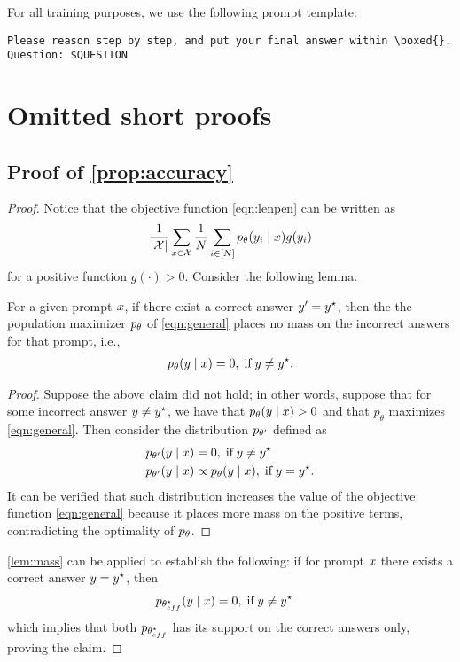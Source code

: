 For all training purposes, we use the following prompt template: 

\texttt{Please reason step by step, and put your final answer within \textbackslash boxed\{\}. Question: \$QUESTION}


\section{Omitted short proofs}
\label{app:proofs}

\subsection{Proof of \cref{prop:accuracy}}
\begin{proof}
Notice that the objective function 
\cref{eqn:lenpen} can be written as 
\begin{align}
\label{eqn:general}
    \frac{1}{|\mathcal X|}\sum_{x{}\in \mathcal X}
    \frac{1}{N}\sum_{i \in [N]} p_\theta(y_i \mid x{}) g(y_{i})
\end{align}
for a positive function $g(\cdot{})> 0$.
Consider the following lemma.

\begin{lemma}
\label{lem:mass}
For a given prompt $x{}$, if there exist a correct answer $y' = y^\star $, then the the population maximizer $p_\theta$ of \cref{eqn:general} places no mass on the incorrect answers for that prompt, i.e.,
\begin{align}
p_\theta(y{} \mid x{}) = 0, \; \text{if} \;  y \neq y^\star.
\end{align}
\end{lemma}
\begin{proof}
Suppose the above claim did not hold; in other words, suppose that for some incorrect answer $y{} \neq y^\star{}$, we have that 
$p_\theta(y{} \mid x{}) > 0$
and that $p_\theta$ maximizes 
\cref{eqn:general}.
Then consider the distribution $p_{\theta'}$ defined as
\begin{align}
    p_{\theta'}(y{} \mid x{}) & = 0, \; \text{if} \; y{} \neq y^\star{} \\
    p_{\theta'}(y{} \mid x{}) & \propto p_{\theta}(y{} \mid x{}), \; \text{if} \; y{} = y^\star{}.
\end{align}
It can be verified that such distribution increases the value of the objective function \eqref{eqn:general} because it places more mass on the positive terms, contradicting the optimality of $p_\theta$.
\end{proof}

\cref{lem:mass} can be applied to establish the following: if for prompt $x{}$ there exists a correct answer $y = y^\star$, then
\begin{align}
    p_{\theta^\star_{eff}}(y{} \mid x{}) & = 0, \; \text{if} \;  y \neq y^\star 
\end{align}
which implies that both $p_{\theta^\star_{eff}}$ 
has its support on the correct answers only, proving the claim.
\end{proof}

